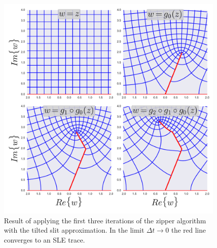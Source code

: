 \begin{figure}
\begin{center}
    \includegraphics[scale=0.5]{chapters/ch4-sle/figs/zipper}
\end{center}
\caption{Result of applying the first three iterations of the zipper algorithm
    with the tilted slit approximation. In the limit $\Delta t\rightarrow 0$
    the red line converges to an SLE trace.}
\label{fig:zipper}
\end{figure}

